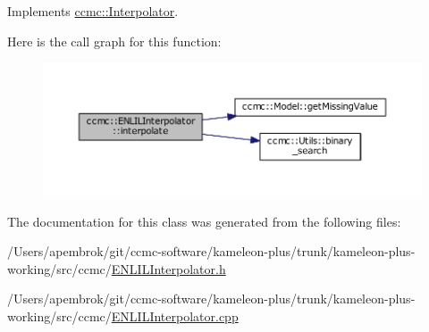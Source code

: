 Implements \hyperlink{classccmc_1_1_interpolator_aa6b272bd53630020d92938ec1e5cfad9}{ccmc\-::\-Interpolator}.



Here is the call graph for this function\-:\nopagebreak
\begin{figure}[H]
\begin{center}
\leavevmode
\includegraphics[width=350pt]{classccmc_1_1_e_n_l_i_l_interpolator_a92508c6305deec651299b7e70ee3c531_cgraph}
\end{center}
\end{figure}




The documentation for this class was generated from the following files\-:\begin{DoxyCompactItemize}
\item 
/\-Users/apembrok/git/ccmc-\/software/kameleon-\/plus/trunk/kameleon-\/plus-\/working/src/ccmc/\hyperlink{_e_n_l_i_l_interpolator_8h}{E\-N\-L\-I\-L\-Interpolator.\-h}\item 
/\-Users/apembrok/git/ccmc-\/software/kameleon-\/plus/trunk/kameleon-\/plus-\/working/src/ccmc/\hyperlink{_e_n_l_i_l_interpolator_8cpp}{E\-N\-L\-I\-L\-Interpolator.\-cpp}\end{DoxyCompactItemize}
